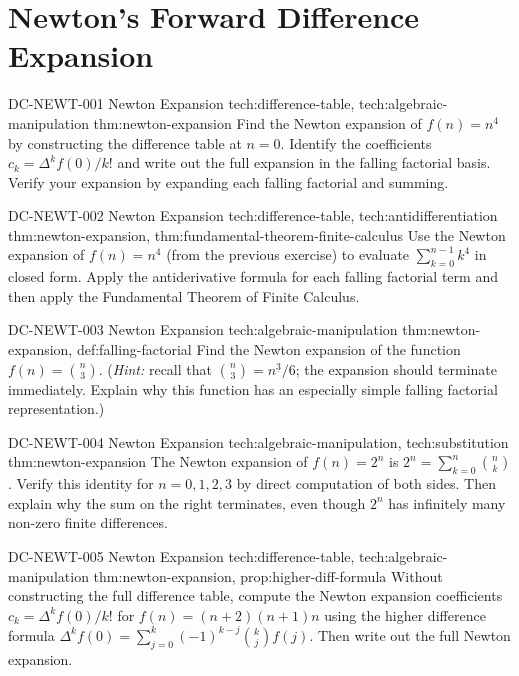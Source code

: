 \section*{Newton's Forward Difference Expansion}

\exstubgenfull
  {DC-NEWT-001}
  {Newton Expansion}
  {tech:difference-table, tech:algebraic-manipulation}
  {thm:newton-expansion}
  {Find the Newton expansion of \(f(n) = n^4\) by constructing the
  difference table at \(n = 0\). Identify the coefficients
  \(c_k = \Delta^k f(0)/k!\) and write out the full expansion in
  the falling factorial basis. Verify your expansion by expanding
  each falling factorial and summing.}

\exstubgenfull
  {DC-NEWT-002}
  {Newton Expansion}
  {tech:difference-table, tech:antidifferentiation}
  {thm:newton-expansion, thm:fundamental-theorem-finite-calculus}
  {Use the Newton expansion of \(f(n) = n^4\) (from the previous exercise)
  to evaluate \(\displaystyle\sum_{k=0}^{n-1}k^4\) in closed form.
  Apply the antiderivative formula for each falling factorial term and
  then apply the Fundamental Theorem of Finite Calculus.}

\exstubgenfull
  {DC-NEWT-003}
  {Newton Expansion}
  {tech:algebraic-manipulation}
  {thm:newton-expansion, def:falling-factorial}
  {Find the Newton expansion of the function \(f(n) = \binom{n}{3}\).
  (\emph{Hint:} recall that \(\binom{n}{3} = n^{\underline{3}}/6\);
  the expansion should terminate immediately. Explain why this
  function has an especially simple falling factorial representation.)}

\exstubgenfull
  {DC-NEWT-004}
  {Newton Expansion}
  {tech:algebraic-manipulation, tech:substitution}
  {thm:newton-expansion}
  {The Newton expansion of \(f(n) = 2^n\) is
  \(2^n = \displaystyle\sum_{k=0}^{n}\binom{n}{k}\).
  Verify this identity for \(n = 0, 1, 2, 3\) by direct computation
  of both sides. Then explain why the sum on the right terminates,
  even though \(2^n\) has infinitely many non-zero finite differences.}

\exstubgenfull
  {DC-NEWT-005}
  {Newton Expansion}
  {tech:difference-table, tech:algebraic-manipulation}
  {thm:newton-expansion, prop:higher-diff-formula}
  {Without constructing the full difference table, compute the Newton
  expansion coefficients \(c_k = \Delta^k f(0)/k!\) for
  \(f(n) = (n+2)(n+1)n\) using the higher difference formula
  \(\Delta^k f(0) = \sum_{j=0}^{k}(-1)^{k-j}\binom{k}{j}f(j)\).
  Then write out the full Newton expansion.}

